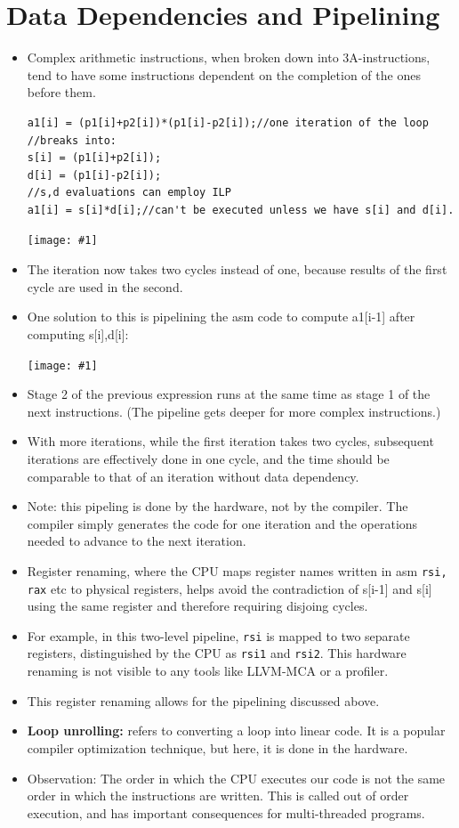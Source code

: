 \documentclass{report}
\newcommand{\mygraphic}[1]{
\begin{center}
    \texttt{[image: \#1]}
\end{center}
}
\begin{document}
\section{Data Dependencies and Pipelining}
\begin{itemize}
\item Complex arithmetic instructions, when broken down into 3A-instructions, tend to have some instructions dependent on the completion of the ones before them.
\begin{lstlisting}
a1[i] = (p1[i]+p2[i])*(p1[i]-p2[i]);//one iteration of the loop
//breaks into:
s[i] = (p1[i]+p2[i]);
d[i] = (p1[i]-p2[i]);
//s,d evaluations can employ ILP
a1[i] = s[i]*d[i];//can't be executed unless we have s[i] and d[i].
\end{lstlisting}
\mygraphic{rsrc/datadependency.png}
\item The iteration now takes two cycles instead of one, because results of the first cycle are used in the second.
\item One solution to this is pipelining the asm code to compute a1[i-1] after computing s[i],d[i]:
\mygraphic{rsrc/pipelining.png}
\item Stage 2 of the previous expression runs at the same time as stage 1 of the next instructions. (The pipeline gets deeper for more complex instructions.)
\item With more iterations, while the first iteration takes two cycles, subsequent iterations are effectively done in one cycle, and the time should be comparable to that of an iteration without data dependency.
\item Note: this pipeling is done by the hardware, not by the compiler. The compiler simply generates the code for one iteration and the operations needed to advance to the next iteration.
\item Register renaming, where the CPU maps register names written in asm \texttt{rsi, rax} etc to physical registers, helps avoid the contradiction of s[i-1] and s[i] using the same register and therefore requiring disjoing cycles.
\item For example, in this two-level pipeline, \texttt{rsi} is mapped to two separate registers, distinguished by the CPU as \texttt{rsi1} and \texttt{rsi2}. This hardware renaming is not visible to any tools like LLVM-MCA or a profiler.
\item This register renaming allows for the pipelining discussed above.
\item \textbf{Loop unrolling:} refers to converting a loop into linear code. It is a popular compiler optimization technique, but here, it is done in the hardware.
\item Observation: The order in which the CPU executes our code is not the same order in which the instructions are written. This is called out of order execution, and has important consequences for multi-threaded programs.
\end{itemize}
\end{document}
